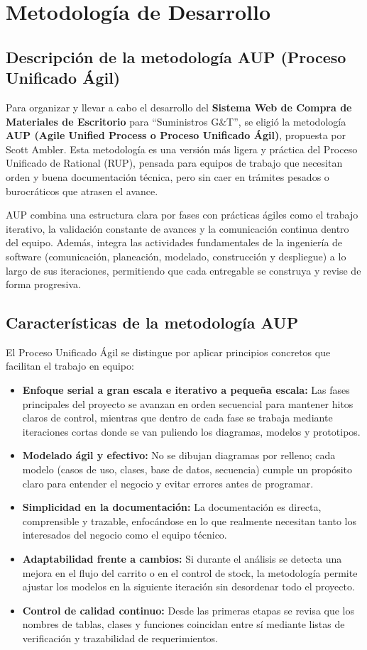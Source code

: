 \section{Metodología de Desarrollo}

\subsection{Descripción de la metodología AUP (Proceso Unificado Ágil)}
Para organizar y llevar a cabo el desarrollo del \textbf{Sistema Web de Compra de Materiales de Escritorio} para ``Suministros G\&T'', se eligió la metodología \textbf{AUP (Agile Unified Process o Proceso Unificado Ágil)}, propuesta por Scott Ambler. Esta metodología es una versión más ligera y práctica del Proceso Unificado de Rational (RUP), pensada para equipos de trabajo que necesitan orden y buena documentación técnica, pero sin caer en trámites pesados o burocráticos que atrasen el avance.

AUP combina una estructura clara por fases con prácticas ágiles como el trabajo iterativo, la validación constante de avances y la comunicación continua dentro del equipo. Además, integra las actividades fundamentales de la ingeniería de software (comunicación, planeación, modelado, construcción y despliegue) a lo largo de sus iteraciones, permitiendo que cada entregable se construya y revise de forma progresiva.

\subsection{Características de la metodología AUP}
El Proceso Unificado Ágil se distingue por aplicar principios concretos que facilitan el trabajo en equipo:
\begin{itemize}
    \item \textbf{Enfoque serial a gran escala e iterativo a pequeña escala:} Las fases principales del proyecto se avanzan en orden secuencial para mantener hitos claros de control, mientras que dentro de cada fase se trabaja mediante iteraciones cortas donde se van puliendo los diagramas, modelos y prototipos.
    \item \textbf{Modelado ágil y efectivo:} No se dibujan diagramas por relleno; cada modelo (casos de uso, clases, base de datos, secuencia) cumple un propósito claro para entender el negocio y evitar errores antes de programar.
    \item \textbf{Simplicidad en la documentación:} La documentación es directa, comprensible y trazable, enfocándose en lo que realmente necesitan tanto los interesados del negocio como el equipo técnico.
    \item \textbf{Adaptabilidad frente a cambios:} Si durante el análisis se detecta una mejora en el flujo del carrito o en el control de stock, la metodología permite ajustar los modelos en la siguiente iteración sin desordenar todo el proyecto.
    \item \textbf{Control de calidad continuo:} Desde las primeras etapas se revisa que los nombres de tablas, clases y funciones coincidan entre sí mediante listas de verificación y trazabilidad de requerimientos.
\end{itemize}


